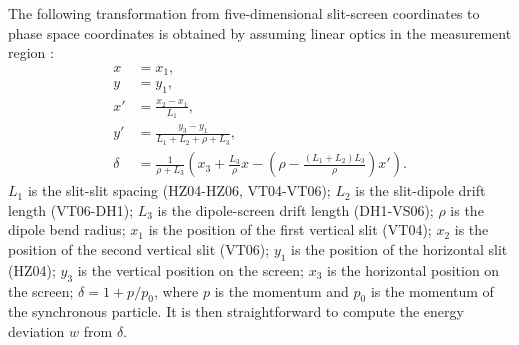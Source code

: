 \documentclass[%
 reprint,
nofootinbib,
 amsmath,amssymb,
 aps,
prstab,
]{revtex4-2}
\begin{document}
The following transformation from five-dimensional slit-screen coordinates to phase space coordinates is obtained by assuming linear optics in the measurement region \cite{Cathey2018-thesis}:
%
\begin{equation}\label{eq:transform}
    \begin{aligned}
    x &= x_1, \\
    y &= y_1, \\
    x' &= \frac{x_2 - x_1}{L_1}, \\
    y' &= \frac{y_3 - y_1}{L_1 + L_2 + \rho + L_3}, \\
    \delta &= \frac{1}{\rho + L_3} 
    \left(
        x_3 + \frac{L_3}{\rho} x -
        \left({
            \rho - \frac{(L_1 + L_2) L_3}{\rho}
        }\right) x'
    \right).
    \end{aligned}
\end{equation}
%
$L_1$ is the slit-slit spacing (HZ04-HZ06, VT04-VT06); $L_2$ is the slit-dipole drift length (VT06-DH1); $L_3$ is the dipole-screen drift length (DH1-VS06); $\rho$ is the dipole bend radius; $x_1$ is the position of the first vertical slit (VT04); $x_2$ is the position of the second vertical slit (VT06); $y_1$ is the position of the horizontal slit (HZ04); $y_3$ is the vertical position on the screen; $x_3$ is the horizontal position on the screen; $\delta = 1 + p/p_0$, where $p$ is the momentum and $p_0$ is the momentum of the synchronous particle. It is then straightforward to compute the energy deviation $w$ from $\delta$.



\end{document}
